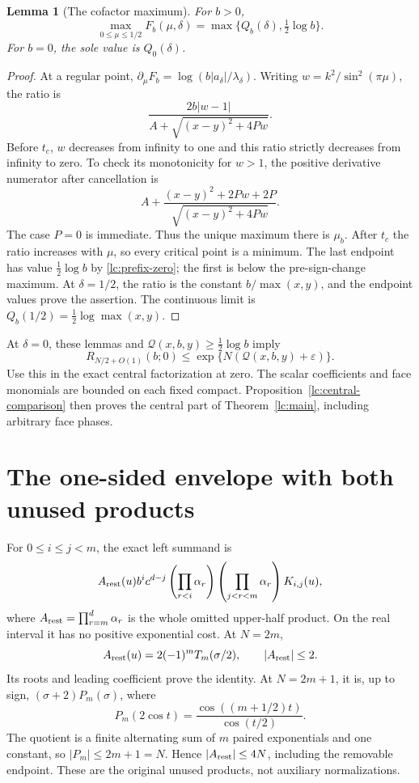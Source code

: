 \documentclass[11pt]{article}
\numberwithin{equation}{section}
\newtheorem{lemma}[theorem]{Lemma}
\theoremstyle{remark}\newtheorem{remark}[theorem]{Remark}
\begin{document}
\begin{lemma}[The cofactor maximum]\label{lc:cofactor-max}
For \(b>0\),
\[
 \max_{0\le\mu\le1/2}F_b(\mu,\delta)
                =\max\{Q_b(\delta),\tfrac12\log b\}.
\]
For \(b=0\), the sole value is \(Q_0(\delta)\).
\end{lemma}
\begin{proof}
At a regular point, \(\partial_\mu F_b=\log(b|a_\delta|/\lambda_\delta)\).
Writing \(w=k^2/\sin^2(\pi\mu)\), the ratio is
\[
                  \frac{2b|w-1|}{A+\sqrt{(x-y)^2+4Pw}} .
\]
Before \(t_c\), \(w\) decreases from infinity to one and this ratio
strictly decreases from infinity to zero. To check its monotonicity
for \(w>1\), the positive derivative numerator after cancellation is
\[
             A+\frac{(x-y)^2+2Pw+2P}{\sqrt{(x-y)^2+4Pw}} .
\]
The case \(P=0\) is immediate. Thus the unique maximum there is
\(\mu_b\). After \(t_c\) the ratio increases with \(\mu\), so
every critical point is a minimum. The last endpoint has value
\(\frac12\log b\) by \eqref{lc:prefix-zero}; the first is below
the pre-sign-change maximum.
At \(\delta=1/2\), the ratio is the constant \(b/\max(x,y)\),
and the endpoint values prove the assertion. The continuous limit is
\(Q_b(1/2)=\frac12\log\max(x,y)\).
\end{proof}

At \(\delta=0\), these lemmas and
\(\mathcal Q(x,b,y)\ge\frac12\log b\) imply
\[
 R_{N/2+O(1)}(b;0)
                  \le\exp\{N(\mathcal Q(x,b,y)+\varepsilon)\}.
\]
Use this in the exact central factorization at zero. The scalar
coefficients and face monomials are bounded on each fixed compact.
Proposition~\ref{lc:central-comparison} then proves the central
part of Theorem~\ref{lc:main}, including arbitrary face phases.

\section{The one-sided envelope with both unused products}\label{lc:left}
For \(0\le i\le j<m\), the exact left summand is
\begin{equation}\label{lc:left-summand}
 A_{\rm rest}(u)b^ic^{d-j}
       \left(\prod_{r<i}\alpha_r\right)
       \left(\prod_{j<r<m}\alpha_r\right)K_{i,j}(u),
\end{equation}
where \(A_{\rm rest}=\prod_{r=m}^d\alpha_r\) is the whole omitted
upper-half product. On the real interval it has no positive
exponential cost. At \(N=2m\),
\[
 A_{\rm rest}(u)=2(-1)^mT_m(\sigma/2),\qquad |A_{\rm rest}|\le2.
\]
Its roots and leading coefficient prove the identity.
At \(N=2m+1\), it is, up to sign, \((\sigma+2)P_m(\sigma)\), where
\[
 P_m(2\cos t)=\frac{\cos((m+1/2)t)}{\cos(t/2)}.
\]
The quotient is a finite alternating sum of \(m\) paired exponentials
and one constant, so \(|P_m|\le2m+1=N\).
Hence \(|A_{\rm rest}|\le4N\), including the removable endpoint.
These are the original unused products, not auxiliary normalizations.
\end{document}
